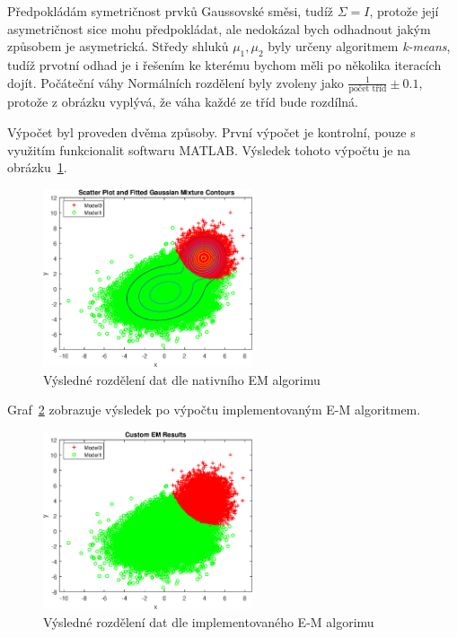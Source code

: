 Předpokládám symetričnost prvků Gaussovské směsi, tudíž \( \Sigma = I \), protože její asymetričnost sice mohu předpokládat, ale nedokázal bych odhadnout jakým způsobem je asymetrická.
Středy shluků \( \mu_1, \mu_2 \) byly určeny algoritmem \textit{k-means}, tudíž prvotní odhad je i řešením ke kterému bychom měli po několika iteracích dojít.
Počáteční váhy Normálních rozdělení byly zvoleny jako \( \frac{1}{\text{počet tříd}} \pm 0.1 \), protože z obrázku vyplývá, že váha každé ze tříd bude rozdílná.

Výpočet byl proveden dvěma způsoby.
První výpočet je kontrolní, pouze s využitím funkcionalit softwaru MATLAB.
Výsledek tohoto výpočtu je na obrázku~\ref{fig:result2}.

\begin{figure}[htb]
    \centering
    \includegraphics[width=0.55\textwidth]{graphs/fig2.eps}
    \caption{Výsledné rozdělení dat dle nativního EM algorimu}
    \label{fig:result2}
\end{figure}
\FloatBarrier

Graf~\ref{fig:result3} zobrazuje výsledek po výpočtu implementovaným E-M algoritmem.

\begin{figure}[htb]
    \centering
    \includegraphics[width=0.55\textwidth]{graphs/fig3.eps}
    \caption{Výsledné rozdělení dat dle implementovaného E-M algorimu}
    \label{fig:result3}
\end{figure}
\FloatBarrier

